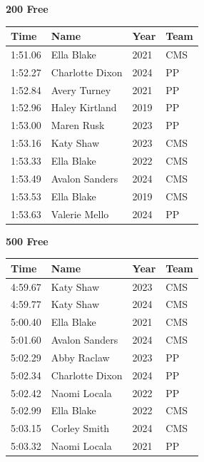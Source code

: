 \vspace{1.2em}
\noindent\begin{minipage}[t]{0.98\textwidth}
\centering
\textbf{\textcolor{teamprimary}{200 Free}}\par
\vspace{0.5em}
\centering
\small
\renewcommand{\arraystretch}{1.0}
\setlength{\tabcolsep}{4pt}
\begin{tabular}{@{}p{2.5cm}p{4.5cm}p{1.5cm}p{2.5cm}@{}}
\toprule
\textbf{Time} & \textbf{Name} & \textbf{Year} & \textbf{Team} \\
\midrule
1:51.06 & Ella Blake & 2021 & CMS \\
1:52.27 & Charlotte Dixon & 2024 & PP \\
1:52.84 & Avery Turney & 2021 & PP \\
1:52.96 & Haley Kirtland & 2019 & PP \\
1:53.00 & Maren Rusk & 2023 & PP \\
1:53.16 & Katy Shaw & 2023 & CMS \\
1:53.33 & Ella Blake & 2022 & CMS \\
1:53.49 & Avalon Sanders & 2024 & CMS \\
1:53.53 & Ella Blake & 2019 & CMS \\
1:53.63 & Valerie Mello & 2024 & PP \\
\bottomrule
\end{tabular}
\end{minipage}
\vspace{1.2em}
\noindent\begin{minipage}[t]{0.98\textwidth}
\centering
\textbf{\textcolor{teamprimary}{500 Free}}\par
\vspace{0.5em}
\centering
\small
\renewcommand{\arraystretch}{1.0}
\setlength{\tabcolsep}{4pt}
\begin{tabular}{@{}p{2.5cm}p{4.5cm}p{1.5cm}p{2.5cm}@{}}
\toprule
\textbf{Time} & \textbf{Name} & \textbf{Year} & \textbf{Team} \\
\midrule
4:59.67 & Katy Shaw & 2023 & CMS \\
4:59.77 & Katy Shaw & 2024 & CMS \\
5:00.40 & Ella Blake & 2021 & CMS \\
5:01.60 & Avalon Sanders & 2024 & CMS \\
5:02.29 & Abby Raclaw & 2023 & PP \\
5:02.34 & Charlotte Dixon & 2024 & PP \\
5:02.42 & Naomi Locala & 2022 & PP \\
5:02.99 & Ella Blake & 2022 & CMS \\
5:03.15 & Corley Smith & 2024 & CMS \\
5:03.32 & Naomi Locala & 2021 & PP \\
\bottomrule
\end{tabular}
\end{minipage}
